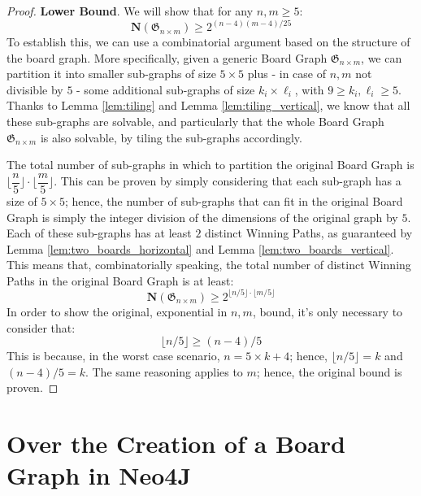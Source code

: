 \documentclass[conference]{IEEEtran}
\begin{document}
\vspace{0.6em}
\begin{proof}
    \textbf{Lower Bound}. We will show that for any $n, m \ge 5$:
    $$
        \mathbf{N}(\mathfrak{G}_{n \times m}) \ge 2^{(n - 4)(m - 4)/25}
    $$
    To establish this, we can use a combinatorial argument based on the structure of the board graph.
    More specifically, given a generic Board Graph $\mathfrak{G}_{n \times m}$, we can partition it into smaller sub-graphs of size $5 \times 5$ plus - in case of $n,m$ not divisible by $5$ - some additional sub-graphs of size $k_i \times \ell_i$, with $9 \ge k_i, \ell_i \ge 5$.
    Thanks to Lemma \ref{lem:tiling} and Lemma \ref{lem:tiling_vertical}, we know that all these sub-graphs are solvable, and particularly that the whole Board Graph $\mathfrak{G}_{n \times m}$ is also solvable, by tiling the sub-graphs accordingly.
    
    The total number of sub-graphs in which to partition the original Board Graph is $\lfloor\dfrac{n}{5}\rfloor \cdot \lfloor\dfrac{m}{5}\rfloor$.
    This can be proven by simply considering that each sub-graph has a size of $5 \times 5$; hence, the number of sub-graphs that can fit in the original Board Graph is simply the integer division of the dimensions of the original graph by $5$.
    Each of these sub-graphs has at least $2$ distinct Winning Paths, as guaranteed by Lemma \ref{lem:two_boards_horizontal} and Lemma \ref{lem:two_boards_vertical}.
    This means that, combinatorially speaking, the total number of distinct Winning Paths in the original Board Graph is at least:
    $$
        \mathbf{N}(\mathfrak{G}_{n \times m}) \ge 2^{\lfloor n/5 \rfloor \cdot \lfloor m/5 \rfloor}
    $$
    In order to show the original, exponential in $n,m$, bound, it's only necessary to consider that:
    $$
        \lfloor n/5 \rfloor \ge (n - 4)/5
    $$
    This is because, in the worst case scenario, $n = 5 \times k + 4$; hence, $\lfloor n/5 \rfloor = k$ and $(n - 4)/5 = k$.
    The same reasoning applies to $m$; hence, the original bound is proven.
\end{proof}

\newpage
\section{Over the Creation of a Board Graph in Neo4J}		\label{appendix:neo4j}
\end{document}
